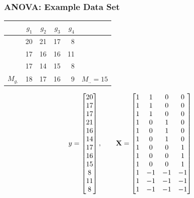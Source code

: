 \documentclass{beamer}
\begin{document}
\begin{frame}[fragile]
  \frametitle{ANOVA: Example Data Set}
\small
\begin{center}
\begin{tabular}{lrrrrr}
  \toprule
  & $g_1$ & $g_2$ & $g_3$ & $g_4$ \\
  \midrule
  & 20 & 21 & 17 & 8 & \\
  & 17 & 16 & 16 & 11 &  \\
  & 17 & 14 & 15 & 8 & \\
  \midrule
$M_{g.}$ & 18& 17 & 16 & 9 & $M_{..}=15$ \\
\bottomrule    
\end{tabular} 
\end{center}
%
\footnotesize
\begin{equation*}
y = \begin{bmatrix}
20 \\ 17 \\ 17 \\
21 \\ 16 \\ 14 \\
17 \\ 16 \\ 15 \\ 
8 \\ 11 \\ 8 
\end{bmatrix}
,\qquad
\mathbf{X} = \begin{bmatrix}
1 & 1 & 0 & 0 \\
1 & 1 & 0 & 0 \\
1 & 1 & 0 & 0 \\
1 & 0 & 1 & 0 \\
1 & 0 & 1 & 0 \\
1 & 0 & 1 & 0 \\
1 & 0 & 0 & 1 \\
1 & 0 & 0 & 1 \\
1 & 0 & 0 & 1 \\
1 & -1 & -1 & -1 \\
1 & -1 & -1 & -1 \\
1 & -1 & -1 & -1
\end{bmatrix}
\end{equation*}
\end{frame}
\end{document}
